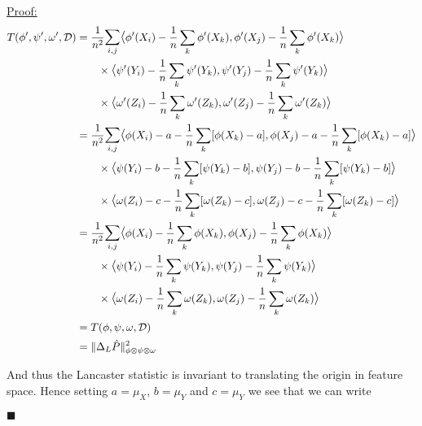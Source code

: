 \documentclass{article}
\newenvironment{claimproof}[1]{\par\noindent\underline{Proof:}\space#1}{\hfill $\blacksquare$}
\begin{document}
\begin{claimproof}
\begin{align*}
T(\phi',\psi',\omega',\mathcal{D}) &=
\frac{1}{n^2}\mathlarger{\sum}_{i,j}\mathlarger{\langle} \phi'(X_i) - \frac{1}{n}\sum_k \phi'(X_k), \phi'(X_j) - \frac{1}{n}\sum_k \phi'(X_k)  \mathlarger{\rangle}\\ & \quad \quad \times \mathlarger{\langle} \psi'(Y_i) - \frac{1}{n}\sum_k \psi'(Y_k), \psi'(Y_j) - \frac{1}{n}\sum_k \psi'(Y_k) \mathlarger{\rangle} \\ & \quad \quad  \times \mathlarger{\langle} \omega'(Z_i) - \frac{1}{n}\sum_k \omega'(Z_k), \omega'(Z_j) - \frac{1}{n}\sum_k \omega'(Z_k) \mathlarger{\rangle}\\&=
\frac{1}{n^2}\mathlarger{\sum}_{i,j}\mathlarger{\langle} \phi(X_i) - a - \frac{1}{n}\sum_k [\phi(X_k)-a], \phi(X_j) - a - \frac{1}{n}\sum_k [\phi(X_k) - a] \mathlarger{\rangle}\\ & \quad \quad \times \mathlarger{\langle} \psi(Y_i) - b - \frac{1}{n}\sum_k [\psi(Y_k)-b], \psi(Y_j)-b - \frac{1}{n}\sum_k [\psi(Y_k)-b] \mathlarger{\rangle} \\ & \quad \quad  \times \mathlarger{\langle} \omega(Z_i)-c - \frac{1}{n}\sum_k [\omega(Z_k)-c], \omega(Z_j)-c - \frac{1}{n}\sum_k [\omega(Z_k)-c] \mathlarger{\rangle}\\&=
\frac{1}{n^2}\mathlarger{\sum}_{i,j}\mathlarger{\langle} \phi(X_i) - \frac{1}{n}\sum_k \phi(X_k), \phi(X_j) - \frac{1}{n}\sum_k \phi(X_k)  \mathlarger{\rangle}\\ & \quad \quad \times \mathlarger{\langle} \psi(Y_i) - \frac{1}{n}\sum_k \psi(Y_k), \psi(Y_j) - \frac{1}{n}\sum_k \psi(Y_k) \mathlarger{\rangle} \\ & \quad \quad  \times \mathlarger{\langle} \omega(Z_i) - \frac{1}{n}\sum_k \omega(Z_k), \omega(Z_j) - \frac{1}{n}\sum_k \omega(Z_k) \mathlarger{\rangle}\\&=
T(\phi,\psi,\omega,\mathcal{D})\\&=
\|\Delta_L \hat{P}\|_{\phi\otimes\psi\otimes\omega}^2
\end{align*}

And thus the Lancaster statistic is invariant to translating the origin in feature space. Hence setting $a = \mu_X$, $b=\mu_Y$ and $c=\mu_Y$ we see that we can write


\end{claimproof}
\end{document}
